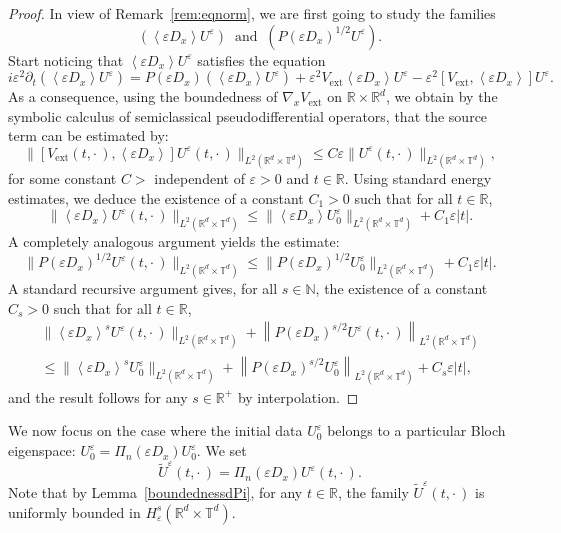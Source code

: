 \documentclass[10pt]{amsart}
\theoremstyle{definition}
\DeclareMathOperator{\ext}{ext}
\newcommand*\R{{\mathbb R}}
\newcommand*\N{{\mathbb N}}
\newcommand*\T{{\mathbb T}}
\newcommand*\eps{\varepsilon}
\numberwithin{equation}{section}
\begin{document}
\begin{proof}
In view of Remark~\ref{rem:eqnorm},
we are first going to study the families
\[
(\left\langle\eps D_x\right\rangle U^\eps)\;\;\text{and}\;\;(P(\eps D_x)^{1/2}U^\eps).
\]
Start noticing that $\left\langle\eps D_x\right\rangle U^\eps$ satisfies the equation
\begin{equation}\label{eq:derU}
i\eps^2 \partial_t (\left\langle\eps D_x\right\rangle U^\eps) = P(\eps D_x) (\left\langle\eps D_x\right\rangle U^\eps) + \eps^2 V_{\ext} \left\langle\eps D_x\right\rangle U^\eps - \eps^2 [V_{\ext}, \left\langle\eps D_x\right\rangle] U^\eps.
\end{equation}
As a consequence, using the boundedness of $\nabla_x V_{\ext}$ on $\R\times\R^d$, we obtain by the symbolic calculus of semiclassical pseudodifferential operators, that the source term can be estimated by:
\[
\|[V_{\ext}(t,\cdot\,), \left\langle\eps D_x\right\rangle] U^\eps(t,\cdot\,)\|_{L^2(\R ^d \times\T^d)}\leq C\eps \|U^\eps(t,\cdot\,)\|_{L^2(\R ^d \times\T^d)},
\]
for some constant $C>$ independent of $\eps>0$ and $t\in\R$. Using standard energy estimates, we deduce the existence of a constant $C_1>0$ such that for all $t\in\R$,
\[
\| \left\langle\eps D_x\right\rangle U^\eps(t,\cdot\,)\| _{L^2(\R ^d \times\T^d)}\leq \| \left\langle\eps D_x\right\rangle U^\eps_0\| _{L^2(\R ^d \times\T^d)}+ C_1\eps |t|.
\]
A completely analogous argument yields the estimate:
\[
\| P(\eps D_x)^{1/2} U^\eps(t,\cdot\,)\| _{L^2(\R ^d \times\T^d)}\leq \| P(\eps D_x)^{1/2} U^\eps_0\| _{L^2(\R ^d \times\T^d)}+ C_1\eps |t|.
\]
A standard recursive argument gives, for all $s\in \N$, the existence of a constant $C_s>0$ such that for all $t\in\R$,
\begin{multline*}
\| \left\langle\eps D_x\right\rangle^s U^\eps(t,\cdot\,)\| _{L^2(\R ^d \times\T^d)}+\left\| P(\eps D_x)^{s/2} U^\eps(t,\cdot\,)\right\| _{L^2(\R ^d \times\T^d)}\\
\leq \| \left\langle\eps D_x\right\rangle^s U^\eps_0\| _{L^2(\R ^d \times\T^d)}+\left\| P(\eps D_x)^{s/2} U^\eps_0\right\| _{L^2(\R ^d \times\T^d)}+ C_s\eps |t|,
\end{multline*}
and the result follows for any $s\in\R^+$ by interpolation.
\end{proof}



We now focus on the case where the initial data $U^\eps_0$ belongs to a particular Bloch eigenspace: $U^\eps_0= \Pi_n(\eps D_x) U^\eps_0$. We set
\[
\widetilde U^\eps(t,\cdot\,)= \Pi_n(\eps D_x) U^\eps(t,\cdot\,).
\]
Note that by Lemma~\ref{boundednessdPi}, for any $t\in\R$, the family $\widetilde U^\eps (t,\cdot\,)$ is uniformly bounded in $H^s_\eps(\R^d\times \T^d)$.
\end{document}
